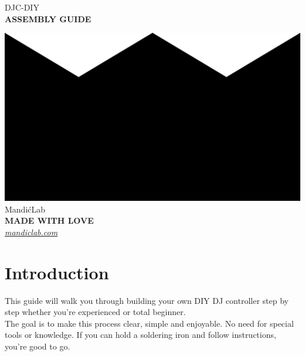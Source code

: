 \documentclass[12pt, a4paper]{article}
\begin{document}
	
	
	\begin{titlepage}
		\begin{center}
			{\fontsize{32pt}{0}\selectfont DJC-DIY} \\
			\vspace{4pt}
			{\fontsize{16pt}{0}\selectfont \textbf{ASSEMBLY GUIDE}} \\
			\vspace{0.5in}
		\end{center}
		
		\vfill
		
		\begin{flushright}
			\begin{minipage}[]{0.3\textwidth}
				\centering
				\includegraphics[width=0.5\linewidth]{assets/logo_mandiclab.png} \\
				\vspace{2pt}
				{\fontsize{16pt}{0}\selectfont MandićLab} \\
				{\fontsize{9}{0}\selectfont \textbf{MADE WITH LOVE}} \\
				{\fontsize{11}{0}\selectfont \textit{\href{https://mandiclab.com}{mandiclab.com}}} \\
			\end{minipage}
		\end{flushright}
	\end{titlepage}
	
	
	\newpage
	\tableofcontents
	\newpage
	
	
	\section{Introduction}
		
		\noindent This guide will walk you through building your own DIY DJ controller step by step whether you're experienced or total beginner. \\
		
		\noindent The goal is to make this process clear, simple and enjoyable. No need for special tools or knowledge. If you can hold a soldering iron and follow instructions, you're good to go. \\
		
\end{document}
